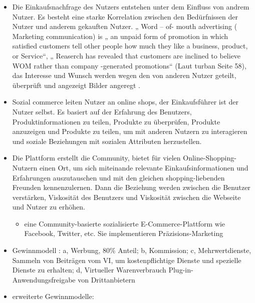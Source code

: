 \begin{itemize}
\item Die Einkaufsnachfrage des Nutzers entstehen unter dem Einfluss von andrem Nutzer. Es besteht eine starke Korrelation zwischen den Bedürfnissen der Nutzer und anderem gekauften Nutzer. „  Word – of- mouth advertising ( Marketing communication) is „ an unpaid form of promotion in which satisfied customers tell other people how much they like a business, product, or Service“, „ Reaserch has revealed that customers are inclined to believe WOM rather than company -generated promotions“ (Laut turban Seite 58), das Interesse und Wunsch werden wegen den von anderen Nutzer geteilt, überprüft und angezeigt Bilder angeregt .
\item Sozial commerce leiten Nutzer an online shops,  der Einkaufsführer ist der Nutzer selbst. Es basiert auf der Erfahrung des Benutzers, Produktinformationen zu teilen, Produkte zu überprüfen, Produkte anzuzeigen und Produkte zu teilen, um mit anderen Nutzern zu interagieren und soziale Beziehungen mit sozialen Attributen herzustellen.
\item Die Plattform erstellt  die Community,  bietet für vielen Online-Shopping-Nutzern einen Ort, um sich miteinande relevante Einkaufsinformationen und Erfahrungen auszutauschen und  mit den gleichen shopping-liebenden Freunden kennenzulernen. Dann die Beziehung werden zwischen die Benutzer verstärken,  Viskosität des Benutzers  und Viskosität zwischen die Webseite und Nutzer zu erhöhen.

\begin{itemize}
\item eine Community-basierte sozialisierte E-Commerce-Plattform wie Facebook, Twitter, etc. Sie implementieren  Präzisions-Marketing
\end{itemize}

\item Gewinnmodell : a, Werbung, 80\% Anteil; b, Kommission; c,  Mehrwertdienste, Sammeln von Beiträgen vom VI, um kostenpflichtige Dienste und spezielle Dienste zu erhalten; d,  Virtueller Warenverbrauch Plug-in-Anwendungsfreigabe von Drittanbietern
\item erweiterte Gewinnmodelle:


\end{itemize}
